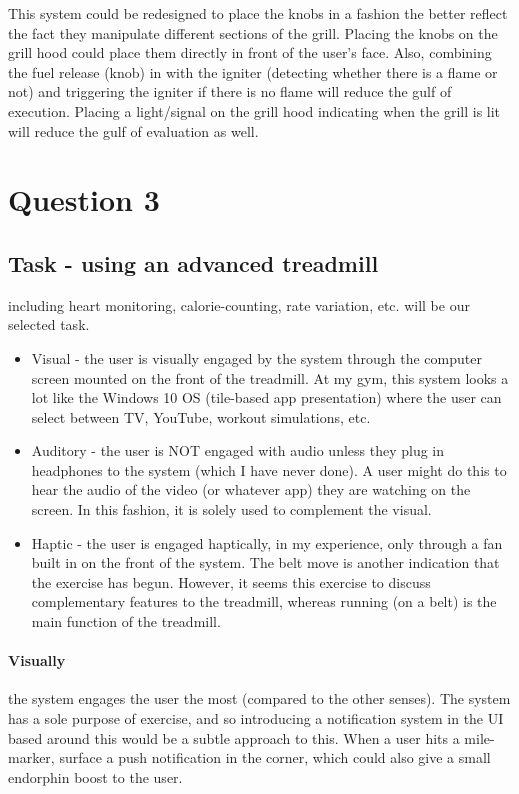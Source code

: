 This system could be redesigned to place the knobs in a fashion the better reflect the fact they manipulate different sections of the grill. Placing the knobs on the grill hood could place them directly in front of the user's face. Also, combining the fuel release (knob) in with the igniter (detecting whether there is a flame or not) and triggering the igniter if there is no flame will reduce the gulf of execution. Placing a light/signal on the grill hood indicating when the grill is lit will reduce the gulf of evaluation as well.

\section{Question 3}

\subsection{Task - using an advanced treadmill}
including heart monitoring, calorie-counting, rate variation, etc. will be our selected task.

\begin{itemize}
\item
  Visual - the user is visually engaged by the system through the computer screen mounted on the front of the treadmill. At my gym, this system looks a lot like the Windows 10 OS (tile-based app presentation) where the user can select between TV, YouTube, workout simulations, etc.
\item
  Auditory - the user is NOT engaged with audio unless they plug in headphones to the system (which I have never done). A user might do this to hear the audio of the video (or whatever app) they are watching on the screen. In this fashion, it is solely used to complement the visual.
\item
  Haptic - the user is engaged haptically, in my experience, only through a fan built in on the front of the system. The belt move is another indication that the exercise has begun. However, it seems this exercise to discuss complementary features to the treadmill, whereas running (on a belt) is the main function of the treadmill.
\end{itemize}

\paragraph{Visually}
the system engages the user the most (compared to the other senses). The system has a sole purpose of exercise, and so introducing a notification system in the UI based around this would be a subtle approach to this. When a user hits a mile-marker, surface a push notification in the corner, which could also give a small endorphin boost to the user.

